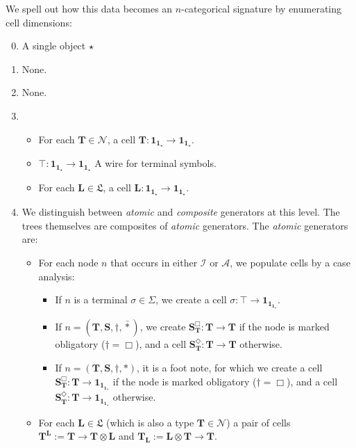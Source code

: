 \begin{defn}
We spell out how this data becomes an $n$-categorical signature by enumerating cell dimensions:

\begin{enumerate}
\setcounter{enumi}{-1}
\item{A single object $\star$}
\item{None.}
\item{None.}
\item{
	\begin{itemize}
	\item{For each $\mathbf{T} \in \mathcal{N}$, a cell $\mathbf{T}: \mathbf{1}_{\mathbf{1}_\star} \rightarrow \mathbf{1}_{\mathbf{1}_\star}$.}
	\item{$\top: \mathbf{1}_{\mathbf{1}_\star} \rightarrow \mathbf{1}_{\mathbf{1}_\star}$ A wire for terminal symbols.}
	\item{For each $\mathbf{L} \in \mathfrak{L}$, a cell $\mathbf{L} : \mathbf{1}_{\mathbf{1}_\star} \rightarrow \mathbf{1}_{\mathbf{1}_\star}$.}
	\end{itemize}
}
\item{
	We distinguish between \emph{atomic} and \emph{composite} generators at this level. The trees themselves are composites of \emph{atomic} generators. The \emph{atomic} generators are:
	\begin{itemize}
	\item{For each node $n$ that occurs in either $\mathcal{I}$ or $\mathcal{A}$, we populate cells by a case analysis:
	\begin{itemize}
		\item{If $n$ is a terminal $\sigma \in \Sigma$, we create a cell $\sigma: \top \rightarrow \mathbf{1}_{\mathbf{1}_{\mathbf{1}_\star}}$.}
		\item{If $n = (\mathbf{T},\mathbf{S},\dagger,\bar{*})$, we create $\mathbf{S}_\mathbf{T}^\Box: \mathbf{T} \rightarrow \mathbf{T}$ if the node is marked obligatory ($\dagger = \Box$), and a cell $\mathbf{S}_\mathbf{T}^\Diamond: \mathbf{T} \rightarrow \mathbf{T}$ otherwise.}
		\item{If $n = (\mathbf{T},\mathbf{S},\dagger,*)$, it is a foot note, for which we create a cell $\mathbf{S}_\mathbf{T}^\Box: \mathbf{T} \rightarrow \mathbf{1}_{\mathbf{1}_{\mathbf{1}_\star}}$ if the node is marked obligatory ($\dagger = \Box$), and a cell $\mathbf{S}_\mathbf{T}^\Diamond: \mathbf{T} \rightarrow \mathbf{1}_{\mathbf{1}_{\mathbf{1}_\star}}$ otherwise.}
	\end{itemize}
	}
	\item{For each $\mathbf{L} \in \mathfrak{L}$ (which is also a type $\mathbf{T} \in \mathcal{N}$) a pair of cells $\mathbf{T}^\mathbf{L} := \mathbf{T} \rightarrow \mathbf{T} \otimes \mathbf{L}$ and $\mathbf{T}_\mathbf{L} := \mathbf{L} \otimes \mathbf{T} \rightarrow \mathbf{T}$.}

\end{itemize}}
\end{enumerate}
\end{defn}

